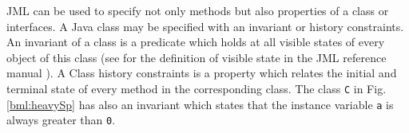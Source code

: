 JML can be used to specify not only methods but also properties of a class or interfaces. 
A Java class may be specified with an invariant or history constraints. An invariant of a class is a predicate which holds at all visible states of
  every object of this class (see for the definition of visible state in the JML reference manual \cite{december-jml}). 
  A Class history constraints is a property which relates the initial and terminal state of every method in the corresponding class. 
 The class \texttt{C}  in Fig.\ref{bml:heavySp} has also an invariant which states that the instance variable \texttt{a} is
 always greater than \texttt{0}.


